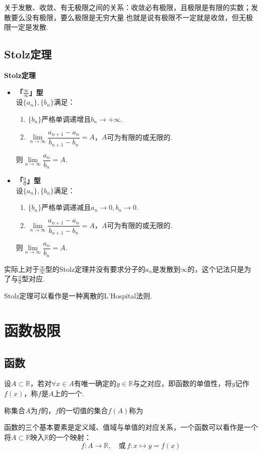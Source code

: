 关于发散、收敛、有无极限之间的关系：收敛必有极限，且极限是有限的实数；发散要么没有极限，要么极限是无穷大量.也就是说有极限不一定就是收敛，但无极限一定是发散.


\subsection{Stolz定理}
\begin{theorem}
    \textbf{Stolz定理}
    \begin{itemize}
        \item \textbf{「$\frac{\infty}{\infty}$」型}\\
        设$\{a_n\},\{b_n\}$满足：
        \begin{enumerate}[circ]
            \item $\{b_n\}$严格单调递增且$b_n \to +\infty$.
            \item $\lim\limits_{n\to\infty}\dfrac{a_{n+1}-a_n}{b_{n+1}-b_n} = A$，$A$可为有限的或无限的.
        \end{enumerate}
        则$\lim\limits_{n\to\infty}\dfrac{a_n}{b_n}=A$.
        \item \textbf{「$\frac{0}{0}$」型}\\
        设$\{a_n\},\{b_n\}$满足：
        \begin{enumerate}[circ]
            \item $\{b_n\}$严格单调递减且$a_n \to 0, b_n \to 0$.
            \item $\lim\limits_{n\to\infty}\dfrac{a_{n+1}-a_n}{b_{n+1}-b_n} = A$，$A$可为有限的或无限的.
        \end{enumerate}
        则$\lim\limits_{n\to\infty}\dfrac{a_n}{b_n}=A$.
    \end{itemize}
\end{theorem}
实际上对于$\frac{\infty}{\infty}$型的Stolz定理并没有要求分子的$a_n$是发散到$\infty$的，这个记法只是为了与$\frac{0}{0}$型对应.

Stolz定理可以看作是一种离散的L'Hospital法则.


\section{函数极限}
\subsection{函数}
\begin{definition}
    设$A \subset \mathbb{R}$，若对$\forall x \in A$有唯一确定的$y \in \mathbb{R}$与之对应，即函数的单值性，将$y$记作$f(x)$，称$f$是$A$上的一个.

    称集合$A$为$f$的，$f$的一切值的集合$f(A)$称为
\end{definition}
函数的三个基本要素是定义域、值域与单值的对应关系，一个函数可以看作是一个将$A \subset \mathbb{R}$映入$\mathbb{R}$的一个映射：
\[f:A\to\mathbb{R},\quad\text{或}\,f:x\mapsto y=f(x)\]

